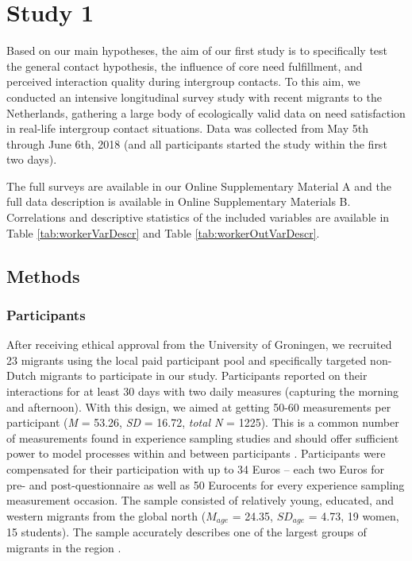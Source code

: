 \section{Study 1}

Based on our main hypotheses, the aim of our first study is to
specifically test the general contact hypothesis, the influence of core
need fulfillment, and perceived interaction quality during intergroup
contacts. To this aim, we conducted an intensive longitudinal survey
study with recent migrants to the Netherlands, gathering a large body of
ecologically valid data on need satisfaction in real-life intergroup
contact situations. Data was collected from May 5th through June 6th,
2018 (and all participants started the study within the first two days).

The full surveys are available in our Online Supplementary Material A
and the full data description is available in Online Supplementary
Materials B. Correlations and descriptive statistics of the included
variables are available in Table \ref{tab:workerVarDescr} and Table
\ref{tab:workerOutVarDescr}.

\subsection{Methods}

\subsubsection{Participants}

After receiving ethical approval from the University of Groningen, we
recruited 23 migrants using the local paid participant pool and
specifically targeted non-Dutch migrants to participate in our study.
Participants reported on their interactions for at least 30 days with
two daily measures (capturing the morning and afternoon). With this
design, we aimed at getting 50-60 measurements per participant
(\textit{M} = 53.26, \textit{SD} = 16.72, \textit{total N} = 1225). This
is a common number of measurements found in experience sampling studies
and should offer sufficient power to model processes within and between
participants \citep[e.g., for a systematic review see][]{AanhetRot2012}.
Participants were compensated for their participation with up to 34
Euros -- each two Euros for pre- and post-questionnaire as well as 50
Eurocents for every experience sampling measurement occasion. The sample
consisted of relatively young, educated, and western migrants from the
global north (\(M_{age}\) = 24.35, \(SD_{age}\) = 4.73, 19 women, 15
students). The sample accurately describes one of the largest groups of
migrants in the region \citep[][]{GemeenteGroningen2015}.

